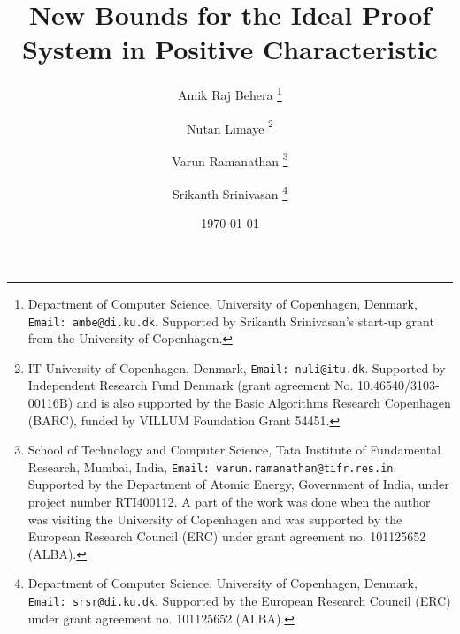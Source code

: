 \documentclass[11pt]{article}
\begin{document}
\title{New Bounds for the Ideal Proof System in Positive Characteristic}
\author{
{Amik Raj Behera \thanks{Department of Computer Science, University of Copenhagen, Denmark, \texttt{Email: ambe@di.ku.dk}. Supported by Srikanth Srinivasan's start-up grant from the University of Copenhagen.}} 
\and 
{Nutan Limaye \thanks{IT University of Copenhagen, Denmark, \texttt{Email: nuli@itu.dk}. Supported by Independent Research Fund Denmark (grant agreement No. 10.46540/3103-00116B) and is also supported by the Basic Algorithms Research Copenhagen (BARC), funded by VILLUM Foundation Grant 54451.}} 
\and 
{Varun Ramanathan \thanks{School of Technology and Computer Science, Tata Institute of Fundamental Research, Mumbai, India, \texttt{Email: varun.ramanathan@tifr.res.in}. Supported by the Department of Atomic Energy, Government of India, under project number RTI400112. A part of the work was done when the author was visiting the University of Copenhagen and was supported by the European Research Council (ERC) under grant agreement no. 101125652 (ALBA).}} 
\and 
{Srikanth Srinivasan \thanks{Department of Computer Science, University of Copenhagen, Denmark, \texttt{Email: srsr@di.ku.dk}. Supported by the European Research Council (ERC) under grant agreement no. 101125652 (ALBA).}}
}
\date{\today}
\maketitle

\end{document}
